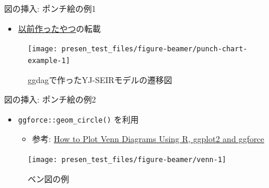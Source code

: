\documentclass[
  14pt,
  ignorenonframetext,
]{beamer}
\providecommand{\tightlist}{%
  \setlength{\itemsep}{0pt}\setlength{\parskip}{0pt}}
\begin{document}
\begin{frame}{図の挿入: ポンチ絵の例1}
\protect\hypertarget{ux56f3ux306eux633fux5165-ux30ddux30f3ux30c1ux7d75ux306eux4f8b1}{}

\begin{itemize}
\tightlist
\item
  \href{https://speakerdeck.com/ktgrstsh/r-and-epidemical-mathematical-models}{以前作ったやつ}の転載
\end{itemize}

\begin{figure}

{\centering \texttt{[image: presen\_test\_files/figure-beamer/punch-chart-example-1]} 

}

\caption{ggdagで作ったYJ-SEIRモデルの遷移図}\label{fig:punch-chart-example}
\end{figure}

\end{frame}

\begin{frame}[fragile]{図の挿入: ポンチ絵の例2}
\protect\hypertarget{ux56f3ux306eux633fux5165-ux30ddux30f3ux30c1ux7d75ux306eux4f8b2}{}

\begin{itemize}
\tightlist
\item
  \texttt{ggforce::geom\_circle()} を利用

  \begin{itemize}
  \tightlist
  \item
    参考:
    \href{https://scriptsandstatistics.wordpress.com/2018/04/26/how-to-plot-venn-diagrams-using-r-ggplot2-and-ggforce/}{How
    to Plot Venn Diagrams Using R, ggplot2 and ggforce}
  \end{itemize}
\end{itemize}

\begin{figure}

{\centering \texttt{[image: presen\_test\_files/figure-beamer/venn-1]} 

}

\caption{ベン図の例}\label{fig:venn}
\end{figure}

\end{frame}
\end{document}
